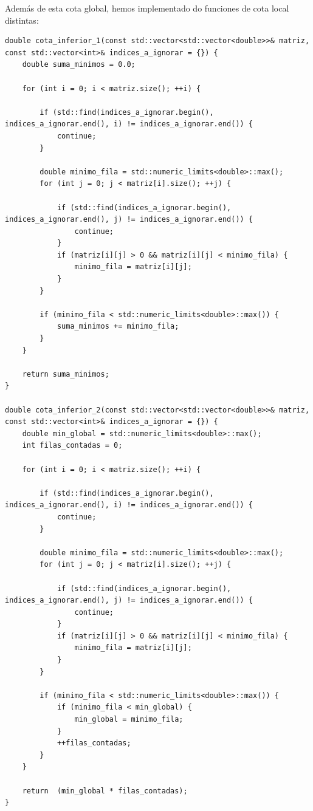 \documentclass[11pt,openany]{book}
\begin{document}
Además de esta cota global, hemos implementado do funciones de cota local distintas:
\\ 
\begin{lstlisting}
double cota_inferior_1(const std::vector<std::vector<double>>& matriz, const std::vector<int>& indices_a_ignorar = {}) {
    double suma_minimos = 0.0;

    for (int i = 0; i < matriz.size(); ++i) {
        
        if (std::find(indices_a_ignorar.begin(), indices_a_ignorar.end(), i) != indices_a_ignorar.end()) {
            continue;
        }

        double minimo_fila = std::numeric_limits<double>::max();
        for (int j = 0; j < matriz[i].size(); ++j) {
            
            if (std::find(indices_a_ignorar.begin(), indices_a_ignorar.end(), j) != indices_a_ignorar.end()) {
                continue;
            }
            if (matriz[i][j] > 0 && matriz[i][j] < minimo_fila) {
                minimo_fila = matriz[i][j];
            }
        }

        if (minimo_fila < std::numeric_limits<double>::max()) {
            suma_minimos += minimo_fila;
        }
    }

    return suma_minimos;
}    

double cota_inferior_2(const std::vector<std::vector<double>>& matriz, const std::vector<int>& indices_a_ignorar = {}) {
    double min_global = std::numeric_limits<double>::max();
    int filas_contadas = 0;

    for (int i = 0; i < matriz.size(); ++i) {
        
        if (std::find(indices_a_ignorar.begin(), indices_a_ignorar.end(), i) != indices_a_ignorar.end()) {
            continue;
        }

        double minimo_fila = std::numeric_limits<double>::max();
        for (int j = 0; j < matriz[i].size(); ++j) {
            
            if (std::find(indices_a_ignorar.begin(), indices_a_ignorar.end(), j) != indices_a_ignorar.end()) {
                continue;
            }
            if (matriz[i][j] > 0 && matriz[i][j] < minimo_fila) {
                minimo_fila = matriz[i][j];
            }
        }

        if (minimo_fila < std::numeric_limits<double>::max()) {
            if (minimo_fila < min_global) {
                min_global = minimo_fila;
            }
            ++filas_contadas;
        }
    }

    return  (min_global * filas_contadas);
}
            
\end{lstlisting}
\end{document}
